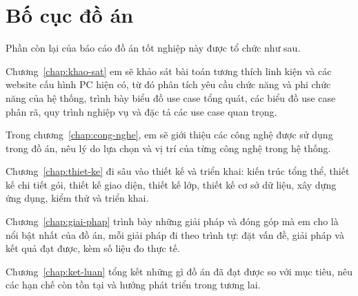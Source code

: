 \section{Bố cục đồ án}

Phần còn lại của báo cáo đồ án tốt nghiệp này được tổ chức như sau.

Chương~\ref{chap:khao-sat} em sẽ khảo sát bài toán tương thích linh kiện và các website cấu hình PC hiện có, từ đó phân tích yêu cầu chức năng và phi chức năng của hệ thống, trình bày biểu đồ use case tổng quát, các biểu đồ use case phân rã, quy trình nghiệp vụ và đặc tả các use case quan trọng.

Trong chương~\ref{chap:cong-nghe}, em sẽ giới thiệu các công nghệ được sử dụng trong đồ án, nêu lý do lựa chọn và vị trí của từng công nghệ trong hệ thống.

Chương~\ref{chap:thiet-ke} đi sâu vào thiết kế và triển khai: kiến trúc tổng thể, thiết kế chi tiết gói, thiết kế giao diện, thiết kế lớp, thiết kế cơ sở dữ liệu, xây dựng ứng dụng, kiểm thử và triển khai.

Chương~\ref{chap:giai-phap} trình bày những giải pháp và đóng góp mà em cho là nổi bật nhất của đồ án, mỗi giải pháp đi theo trình tự: đặt vấn đề, giải pháp và kết quả đạt được, kèm số liệu đo thực tế.

Chương~\ref{chap:ket-luan} tổng kết những gì đồ án đã đạt được so với mục tiêu, nêu các hạn chế còn tồn tại và hướng phát triển trong tương lai.
